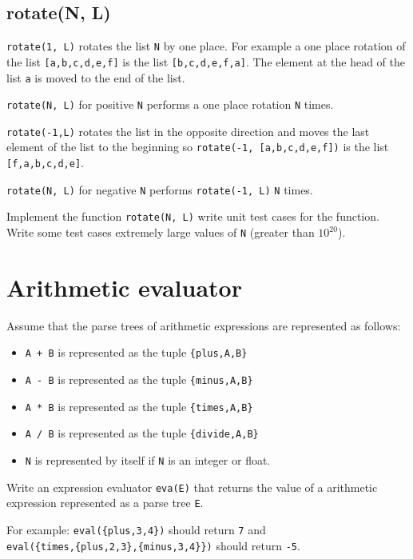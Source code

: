 \documentclass[12pt]{hitec}
\begin{document}
\subsection{rotate(N, L)}

\verb+rotate(1, L)+ rotates the list \verb+N+ by one place.
For example a one place rotation of the list \verb+[a,b,c,d,e,f]+ is the list
\verb+[b,c,d,e,f,a]+. The element at the head of the list \verb+a+ is moved
to the end of the list.

\verb+rotate(N, L)+ for positive \verb+N+ performs a one place rotation \verb+N+ times.

\verb+rotate(-1,L)+ rotates the list in the opposite direction and moves the
last element of the list to the beginning 
so  \verb+rotate(-1, [a,b,c,d,e,f])+ is the list
\verb+[f,a,b,c,d,e]+.

\verb+rotate(N, L)+ for negative \verb+N+ performs \verb+rotate(-1, L)+ \verb+N+ times.

Implement the function \verb+rotate(N, L)+ write unit test cases for the
function. Write some test cases extremely large values
of \verb+N+ (greater than $10^{20}$).

\section{Arithmetic evaluator}

Assume that the parse trees of
arithmetic expressions are represented as follows:

\begin{itemize}
\item \verb=A + B= is represented as the tuple \verb+{plus,A,B}+
\item \verb=A - B= is represented as the tuple \verb+{minus,A,B}+
\item \verb=A * B= is represented as the tuple \verb+{times,A,B}+
\item \verb=A / B= is represented as the tuple \verb+{divide,A,B}+
\item \verb+N+ is represented by itself if \verb+N+ is an integer or float.
\end{itemize}

Write an expression evaluator \verb+eva(E)+ that returns the value of a arithmetic
expression represented as a parse tree \verb+E+.

For example:
\verb+eval({plus,3,4})+ should return \verb+7+ and
\\
\verb+eval({times,{plus,2,3},{minus,3,4}})+ should return \verb+-5+.
\end{document}
